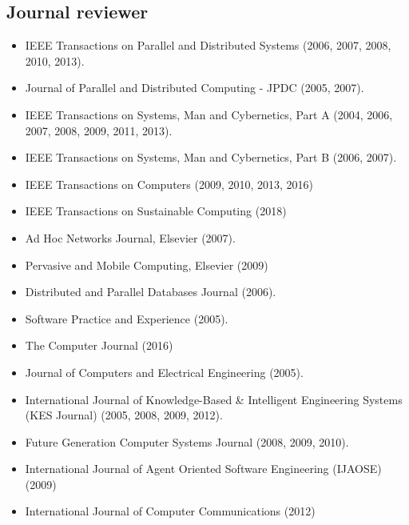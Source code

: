 \subsection*{Journal reviewer}
    
\begin{itemize}

\item IEEE Transactions on Parallel and Distributed Systems (2006, 2007, 2008, 2010, 2013).

\item Journal of Parallel and Distributed Computing - JPDC (2005, 2007).

\item IEEE Transactions on Systems, Man and Cybernetics, Part A (2004, 2006, 2007, 2008, 2009, 2011, 2013).

\item IEEE Transactions on Systems, Man and Cybernetics, Part B (2006, 2007).

\item IEEE Transactions on Computers (2009, 2010, 2013, 2016)

\item IEEE Transactions on Sustainable Computing (2018)

\item Ad Hoc Networks Journal, Elsevier (2007).

\item Pervasive and Mobile Computing, Elsevier (2009)

\item Distributed and Parallel Databases Journal (2006).

\item Software Practice and Experience (2005).

\item The Computer Journal (2016)

\item Journal of Computers and Electrical Engineering (2005).

\item International Journal of Knowledge-Based \& Intelligent Engineering Systems (KES Journal) (2005, 2008, 2009, 2012).

\item Future Generation Computer Systems Journal (2008, 2009, 2010).

\item International Journal of Agent Oriented Software Engineering (IJAOSE) (2009)

\item International Journal of Computer Communications (2012)


\end{itemize}
